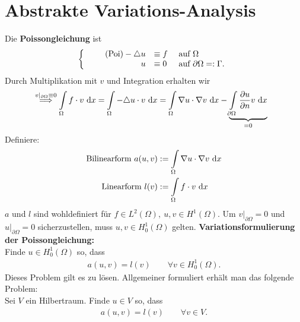 \section{Abstrakte Variations-Analysis}
Die \textbf{Poissongleichung} ist
\begin{align}
	\left\{
	\begin{array}{r l l}\label{PoissonEquation}\tag{Poi}
		-\triangle u &\equiv f &\text{ auf }\Omega \\
		u &\equiv 0 &\text{ auf }\partial\Omega=:\Gamma.
	\end{array}\right.
\end{align}
Durch Multiplikation mit $v$ und Integration erhalten wir
\begin{align*}
&\stackrel{ v|_{\partial\Omega}\equiv0}{\implies}
\int\limits_\Omega f\cdot v\text{ d} x
=\int\limits_\Omega-\triangle u\cdot v\text{ d} x
=\int\limits_\Omega\nabla u\cdot\nabla v\text{ d} x-\underbrace{\int\limits_{\partial\Omega}\frac{\partial u}{\partial n}v\text{ d} x}_{=0}
\end{align*}
Definiere:
\begin{align*}
\text{Bilinearform } a(u,v)&:=\int\limits_\Omega\nabla u\cdot\nabla v\text{ d} x\\
\text{Linearform } l(v)&:=\int\limits_\Omega f\cdot v\text{ d} x
\end{align*}
$a$ und $l$ sind wohldefiniert für $f\in L^2(\Omega),~u,v\in H^1(\Omega)$. Um $v|_{\partial\Omega}=0$ und $u|_{\partial\Omega}=0$ sicherzustellen, muss $u,v\in H^1_0(\Omega)$ gelten.\nl
\textbf{Variationsformulierung der Poissongleichung:}\\
Finde $u\in H_0^1(\Omega)$ so, dass
\begin{align*}
a(u,v)=l(v)\qquad\forall v\in H^1_0(\Omega).
\end{align*}
Dieses Problem gilt es zu lösen. Allgemeiner formuliert erhält man das folgende Problem:\\
Sei $V$ ein Hilbertraum. Finde $u\in V$ so, dass
\begin{align*}
a(u,v)=l(v)\qquad\forall v\in V.
\end{align*}


